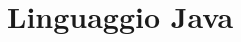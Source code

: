 \documentclass[../main.tex]{subfiles}
\begin{document}
\clearpage
\thispagestyle{empty}
\vspace*{7cm}
\section{Linguaggio Java}
\vspace*{1.5cm}










	
\end{document}
